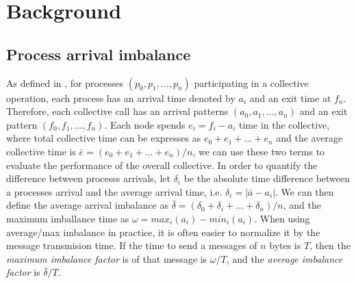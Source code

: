 \section{Background}

\subsection{Process arrival imbalance} %
As defined in \cite{Faraj2008StudyProcArrivalMPIColl}, for processes $(p_0, p_1,...,p_n)$ participating in a collective operation, each process has an arrival time denoted by $a_i$ and an exit time at $f_n$.
Therefore, each collective call has an arrival patterns $(a_0, a_1, ..., a_n)$ and an exit pattern $(f_0, f_1, ..., f_n)$.
Each node spends $e_i = f_i - a_i$ time in the collective, where total collective time can be expresses as $e_0 + e_1 + ... + e_n$ and the average collective time is $\bar{e} = (e_0 + e_1 + ... + e_n)/n$, we can use these two terms to evaluate the performance of the overall collective.
In order to quantify the difference between processs arrivals, let $\delta_i$ be the absolute time difference between a processes arrival and the average arrival time, i.e. $\delta_i = |\bar{a} - a_i|$. 
We can then define the average arrival imbalance as $\bar{\delta}=(\delta_0 + \delta_i + ... + \delta_n)/n$, and the maximum imballance time as $\omega = max_i(a_i)-min_i(a_i)$.
When using average/max imbalance in practice, it is often easier to normalize it by the message transmision time.
If the time to send a messages of $n$ bytes is $T$, then the \textit{maximum imbalance factor} is of that message is $\omega/T$, and the \textit{average imbalance factor} is $\bar{\delta}/T$.


